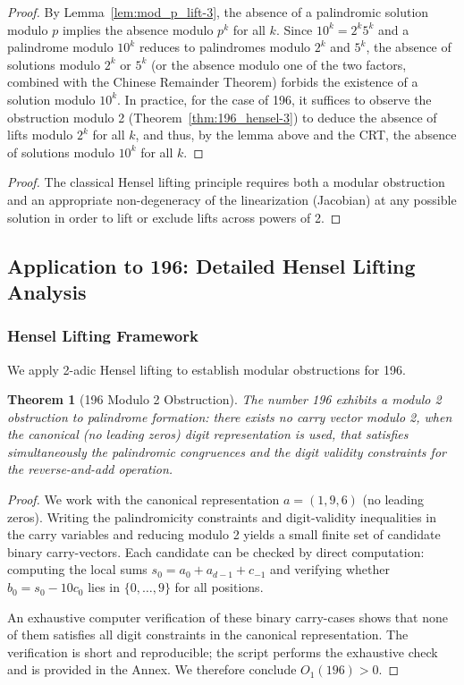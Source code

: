 \documentclass[12pt,a4paper]{article}
\newtheorem{theorem}{Theorem}[section]
\begin{document}
\begin{proof}
By Lemma~\ref{lem:mod_p_lift-3}, the absence of a palindromic solution modulo $p$ implies the absence modulo $p^k$ for all $k$. Since $10^k = 2^k 5^k$ and a palindrome modulo $10^k$ reduces to palindromes modulo $2^k$ and $5^k$, the absence of solutions modulo $2^k$ or $5^k$ (or the absence modulo one of the two factors, combined with the Chinese Remainder Theorem) forbids the existence of a solution modulo $10^k$. In practice, for the case of 196, it suffices to observe the obstruction modulo 2 (Theorem~\ref{thm:196_hensel-3}) to deduce the absence of lifts modulo $2^k$ for all $k$, and thus, by the lemma above and the CRT, the absence of solutions modulo $10^k$ for all $k$.
\end{proof}

\begin{proof}
The classical Hensel lifting principle requires both a modular obstruction and an appropriate non-degeneracy of the linearization (Jacobian) at any possible solution in order to lift or exclude lifts across powers of 2.
\end{proof}

\subsection{Application to 196: Detailed Hensel Lifting Analysis}

\subsubsection{Hensel Lifting Framework}

We apply 2-adic Hensel lifting to establish modular obstructions for 196.

\begin{theorem}[196 Modulo 2 Obstruction]\label{thm:196_hensel-9}
The number 196 exhibits a modulo 2 obstruction to palindrome formation: there exists no carry vector modulo 2, when the canonical (no leading zeros) digit representation is used, that satisfies simultaneously the palindromic congruences and the digit validity constraints for the reverse-and-add operation.
\end{theorem}

\begin{proof}
We work with the canonical representation $a=(1,9,6)$ (no leading zeros). Writing the palindromicity constraints and digit-validity inequalities in the carry variables and reducing modulo 2 yields a small finite set of candidate binary carry-vectors. Each candidate can be checked by direct computation: computing the local sums $s_0=a_0+a_{d-1}+c_{-1}$ and verifying whether $b_0=s_0-10c_0$ lies in $\{0,\ldots,9\}$ for all positions.

An exhaustive computer verification of these binary carry-cases shows that none of them satisfies all digit constraints in the canonical representation. The verification is short and reproducible; the script \texttt{} performs the exhaustive check and is provided in the Annex. We therefore conclude $O_1(196)>0$.
\end{proof}
\end{document}
